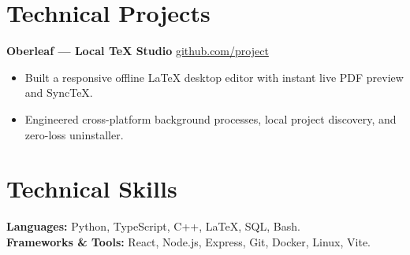 \documentclass[a4paper, 10pt]{article}
\begin{document}
\section{Technical Projects}
\textbf{Oberleaf --- Local TeX Studio} \hfill \href{https://github.com}{github.com/project}
\begin{itemize}
  \item Built a responsive offline LaTeX desktop editor with instant live PDF preview and SyncTeX.
  \item Engineered cross-platform background processes, local project discovery, and zero-loss uninstaller.
\end{itemize}

\section{Technical Skills}
\textbf{Languages:} Python, TypeScript, C++, LaTeX, SQL, Bash. \\
\textbf{Frameworks \& Tools:} React, Node.js, Express, Git, Docker, Linux, Vite.
\end{document}

